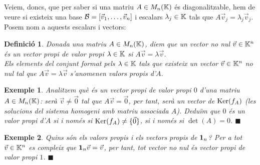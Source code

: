 \documentclass[
  11pt,
]{book}
\numberwithin{dummy}{section}
\theoremstyle{maincolornumbox}
\theoremstyle{blacknumex}
\newtheorem{exampleT}{Exemple}[chapter]
\theoremstyle{blacknumbox}
\newtheorem{definitionT}{Definició}[chapter]
\theoremstyle{maincolornum}
\newenvironment{definition}{\begin{dBox}\begin{definitionT}}{\end{definitionT}\end{dBox}}
\newenvironment{example}{\begin{exampleT}}{\hfill{\tiny\ensuremath{\blacksquare}}\end{exampleT}}
\begin{document}
Veiem, doncs, que per saber si una matriu \(A\in M_n(\mathbb{K})\) és
diagonalitzable, hem de veure si existeix una base
\(\mathcal{B}=[\vec v_1, \dots, \vec v_n]\) i escalars \(\lambda_j\in\mathbb{K}\) tals que
\(A\vec v_j=\lambda_j \vec v_j\). Posem nom a aquests escalars i vectors:

\begin{definition}
\protect\hypertarget{def:vapivep}{}\label{def:vapivep}Donada una matriu \(A\in M_n(\mathbb{K})\),
diem que un vector no nul \(\vec v\in \mathbb{K}^n\) és un \emph{vector propi} de
\emph{valor propi} \(\lambda \in \mathbb{K}\) si \(A\vec v=\lambda \vec v\).\\
Els elements del conjunt format pels \(\lambda\in \mathbb{K}\) tals que existeix
un vector \(\vec v\in\mathbb{K}^n\) no nul tal que \(A\vec v=\lambda \vec v\)
s'anomenen \emph{valors propis d'\(A\)}.
\end{definition}

\begin{example}
Analitzem què és un vector propi de valor propi \(0\) d'una matriu
\(A\in M_n(\mathbb{K})\): serà \(\vec v\neq \vec 0\) tal que \(A\vec v=\vec 0\), per
tant, serà un vector de \(\operatorname{Ker}(f_A)\) (les solucions del sistema homogeni
amb matriu associada \(A\)). Deduïm que \(0\) és un valor propi d'\(A\) si i
només si \(\operatorname{Ker}(f_A)\neq \{\vec 0\}\), si i només si \(\det(A)=0\).
\end{example}

\begin{example}
\protect\hypertarget{exm:nuclivap0}{}\label{exm:nuclivap0}Quins són els valors propis i
els vectors propis de \(\mathbf{1}_n\)? Per a tot \(\vec v\in\mathbb{K}^n\) es compleix que
\(\mathbf{1}_n\vec v=\vec v\), per tant, tot vector no nul és vector propi de
valor propi \(1\).
\end{example}
\end{document}

